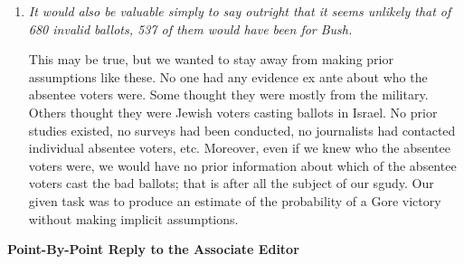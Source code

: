 \documentclass[11pt]{article}
\begin{document}
\begin{enumerate}
  Although our BMA analysis does not explore the entire model space,
  since that is impossible, it is superior to any of the standard
  approaches.  In particular, BMA is better at estimating a predictive
  quantity than any submodel being averaged over, even if the true
  model is {\it outside} the set of submodels being averaged over
  (e.g., Madigan and Raftery, 1994 JASA).  (Almost the same result
  exists in the literature on committee methods (e.g., Bishop, 1995).)
  Our BMA approach is known to be better than any submodel that is
  averaged over in our analysis including the one suggested by the
  referee.  With the methods we introduced in this paper, making it
  possible to use BMA with ecological inference, these advances would
  not be available.
  
  Since the entire model space is infinite, it is always possible that
  someone may finds a new submodel to include in a BMA.  No one has
  suggested a plausible story, and accompanying model, that we have
  excluded, and that produces markedly different inferences and has a
  high probability of being correct, but we are certainly open to be
  proved wrong if someone finds such a model.  Of course, every
  empirical analysis is vulnerable to this criticism that there might
  be a better model that was not considered in the original analysis.
  
\item {\it It would also be valuable simply to say outright that it
    seems unlikely that of 680 invalid ballots, 537 of them would
    have been for Bush.}
  
  This may be true, but we wanted to stay away from making prior
  assumptions like these.  No one had any evidence ex ante about who
  the absentee voters were.  Some thought they were mostly from the
  military.  Others thought they were Jewish voters casting ballots in
  Israel.  No prior studies existed, no surveys had been conducted, no
  journalists had contacted individual absentee voters, etc.
  Moreover, even if we knew who the absentee voters were, we would
  have no prior information about which of the absentee voters cast
  the bad ballots; that is after all the subject of our sgudy.  Our
  given task was to produce an estimate of the probability of a Gore
  victory without making implicit assumptions.
\end{enumerate}


\clearpage
\begin{center}
  {\bf \Large Point-By-Point Reply to the Associate Editor}
\end{center}
\end{document}
